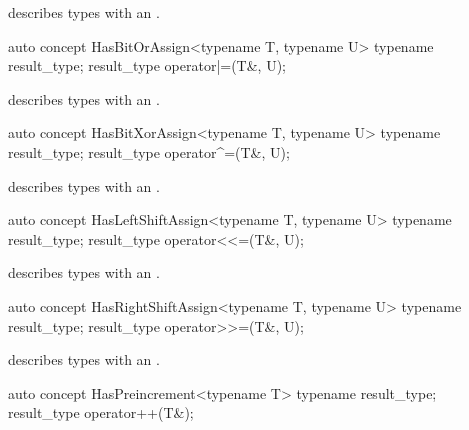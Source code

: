 \documentclass[american,twoside]{book}
\begin{document}
\begin{itemdescr}
\pnum
\mbox{\reallynote} describes types with an \mbox{}.
\end{itemdescr}

\begin{itemdecl}
auto concept HasBitOrAssign<typename T, typename U> {
  typename result_type;
  result_type operator|=(T&, U);
}
\end{itemdecl}

\begin{itemdescr}
\pnum
\mbox{\reallynote} describes types with an \mbox{}.
\end{itemdescr}

\begin{itemdecl}
auto concept HasBitXorAssign<typename T, typename U> {
  typename result_type;
  result_type operator^=(T&, U);
}
\end{itemdecl}

\begin{itemdescr}
\pnum
\mbox{\reallynote} describes types with an \mbox{}.
\end{itemdescr}

\begin{itemdecl}
auto concept HasLeftShiftAssign<typename T, typename U> {
  typename result_type;
  result_type operator<<=(T&, U);
}
\end{itemdecl}

\begin{itemdescr}
\pnum
\mbox{\reallynote} describes types with an \mbox{}.
\end{itemdescr}

\begin{itemdecl}
auto concept HasRightShiftAssign<typename T, typename U> {
  typename result_type;
  result_type operator>>=(T&, U);
}
\end{itemdecl}

\begin{itemdescr}
\pnum
\mbox{\reallynote} describes types with an \mbox{}.
\end{itemdescr}

\begin{itemdecl}
auto concept HasPreincrement<typename T> {
  typename result_type;
  result_type operator++(T&);
}
\end{itemdecl}

\begin{itemdescr}
\pnum
{}
\end{itemdescr}
\end{document}
